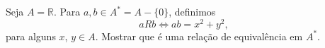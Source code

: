 \item Seja $A=\mathbb{R}$. Para $a, b\in A^\ast=A-\{0\}$, definimos
\[ aRb  \Leftrightarrow ab =x^2+y^2
,\]
para alguns $x$, $y\in A$. Mostrar que é uma relação de equivalência em $A^\ast$.

